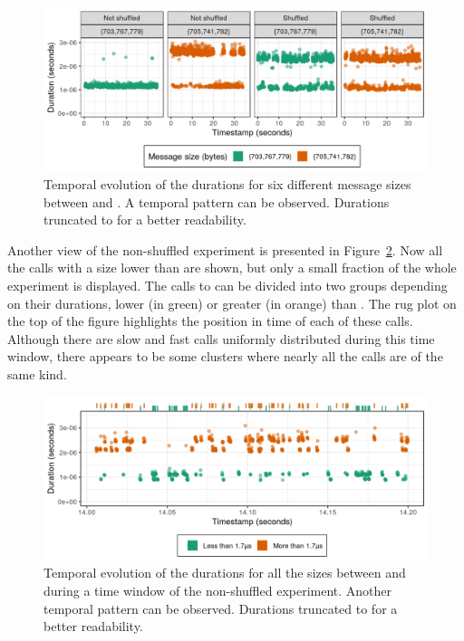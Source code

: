         \begin{figure}[htpb]
            \centering
            \includegraphics[width=0.8\linewidth]{img/experiment/randomizing_order/evolution.png}
            \caption{Temporal evolution of the \recv durations for six different message sizes between 
            and . A temporal pattern can be observed. Durations truncated to  for
            a better readability.}%
            \label{fig:randomizing_order:evolution}
        \end{figure}

        Another view of the non-shuffled experiment is presented in Figure~\ref{fig:randomizing_order:evolution_rug}.
        Now all the calls with a size lower than  are shown, but only a small fraction of the whole
        experiment is displayed. The calls to \recv can be divided into two groups depending on their durations, lower
        (in green) or greater (in orange) than . The rug plot on the top of the figure
        highlights the position in time of each of these \recv calls. Although there are slow and fast calls uniformly
        distributed during this time window, there appears to be some clusters where nearly all the calls are of the
        same kind.

        \begin{figure}[htpb]
            \centering
            \includegraphics[width=0.8\linewidth]{img/experiment/randomizing_order/evolution_rug.png}
            \caption{Temporal evolution of the \recv durations for all the sizes between  and
             during a  time window of the non-shuffled experiment. Another temporal
            pattern can be observed.  Durations truncated to  for a better readability.}%
            \label{fig:randomizing_order:evolution_rug}
        \end{figure}


